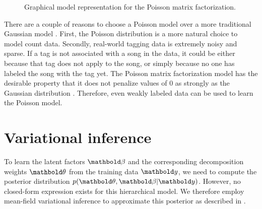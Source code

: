 \begin{figure}[ht]
  \centering
     
  \caption{Graphical model representation for the Poisson matrix factorization.}
\label{chpt:background:fig:pmf}
\end{figure}

There are a couple of reasons to choose a Poisson model over a more traditional Gaussian model \citep{salakhutdinov2008probabilistic}. First, the Poisson distribution is a more natural choice to model count data. Secondly, real-world tagging data is extremely noisy and sparse. If a tag is not associated with a song in the data, it could be either because that tag does not apply to the song, or simply because no one has labeled the song with the tag yet. The Poisson matrix factorization model has the desirable property that it does not penalize values of $0$ as strongly as the Gaussian distribution \citep{paisley2015handbook,Gopalan:2015}. Therefore, even weakly labeled data can be used to learn the Poisson model.  

\section{Variational inference}

To learn the latent factors $\mb{\beta}$ and the corresponding decomposition weights $\mb{\theta}$ from the training data $\mb{y}$, we need to compute the posterior distribution $p(\mb{\theta}, \mb{\beta} | \mb{y})$. However, no closed-form expression exists for this hierarchical model. We therefore employ mean-field variational inference to approximate this posterior as described in .

